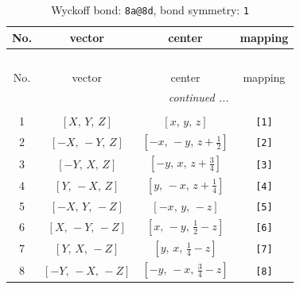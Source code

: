 \documentclass[fleqn,8pt]{jsarticle}
\begin{document}
\begin{longtable}{cccc}
\caption{Wyckoff bond: {\tt 8a@8d}, bond symmetry: {\tt 1}}
 \\
 \hline \hline
No. & vector & center & mapping \\ \hline \endfirsthead

\multicolumn{3}{l}{\tablename\ \thetable{}} \\
 \hline \hline
No. & vector & center & mapping \\ \hline \endhead

 \hline \hline
\multicolumn{3}{r}{\footnotesize\it continued ...} \\ \endfoot

 \hline \hline
\multicolumn{3}{r}{} \\ \endlastfoot

1 & $\left[ X,\, Y,\, Z \right]$ & $\left[ x,\, y,\, z \right]$ & {\tt [1]} \\ \hline
2 & $\left[ - X,\, - Y,\, Z \right]$ & $\left[ - x,\, - y,\, z + \frac{1}{2} \right]$ & {\tt [2]} \\ \hline
3 & $\left[ - Y,\, X,\, Z \right]$ & $\left[ - y,\, x,\, z + \frac{3}{4} \right]$ & {\tt [3]} \\ \hline
4 & $\left[ Y,\, - X,\, Z \right]$ & $\left[ y,\, - x,\, z + \frac{1}{4} \right]$ & {\tt [4]} \\ \hline
5 & $\left[ - X,\, Y,\, - Z \right]$ & $\left[ - x,\, y,\, - z \right]$ & {\tt [5]} \\ \hline
6 & $\left[ X,\, - Y,\, - Z \right]$ & $\left[ x,\, - y,\, \frac{1}{2} - z \right]$ & {\tt [6]} \\ \hline
7 & $\left[ Y,\, X,\, - Z \right]$ & $\left[ y,\, x,\, \frac{1}{4} - z \right]$ & {\tt [7]} \\ \hline
8 & $\left[ - Y,\, - X,\, - Z \right]$ & $\left[ - y,\, - x,\, \frac{3}{4} - z \right]$ & {\tt [8]} \\
\end{longtable}
\end{document}
